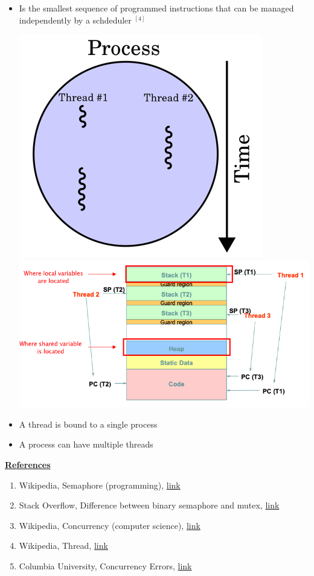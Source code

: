 \documentclass[12pt]{article}
\begin{document}
\begin{itemize}
    \item Is the smallest sequence of programmed instructions that can be managed independently
    by a schdeduler $^{[4]}$

    \begin{center}
    \includegraphics[width=0.4\linewidth]{images/midterm_1_solution_6.png}
    \includegraphics[width=\linewidth]{images/midterm_1_solution_7.png}
    \end{center}

    \item A thread is bound to a single process
    \item A process can have multiple threads
\end{itemize}

\bigskip

\underline{\textbf{References}}

\begin{enumerate}[1)]
    \item Wikipedia, Semaphore (programming), \href{https://en.wikipedia.org/wiki/Semaphore_(programming)}{link}
    \item Stack Overflow, Difference between binary semaphore and mutex, \href{https://stackoverflow.com/questions/62814/difference-between-binary-semaphore-and-mutex}{link}
    \item Wikipedia, Concurrency (computer science), \href{https://en.wikipedia.org/wiki/Concurrency_(computer_science)}{link}
    \item Wikipedia, Thread, \href{https://en.wikipedia.org/wiki/Thread_(computing)#:~:text=In%20computer%20science%2C%20a%20thread,part%20of%20the%20operating%20system.}{link}
    \item Columbia University, Concurrency Errors, \href{https://www.cs.columbia.edu/~junfeng/13fa-w4118/lectures/l11-concurrency-error.pdf}{link}
\end{enumerate}
\end{document}

